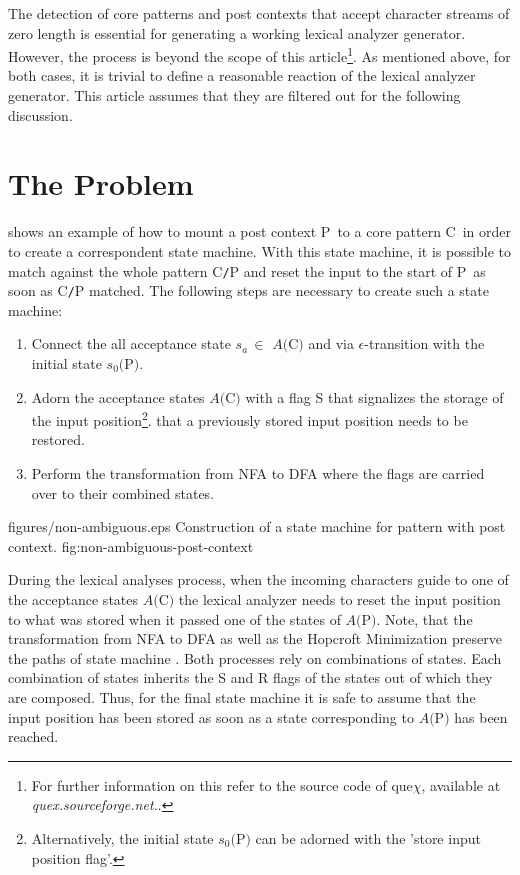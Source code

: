 \documentclass[acmtoplas]{acmtrans2m}
\newcommand{\quex}{que$\chi$}
\newcommand{\fa}[1]{$A(${\sf #1}$)$}
\newcommand{\fsz}[1]{$s_0(${\sf #1}$)$}
\newcommand{\pP}{{\sf P}}
\newcommand{\pC}{{\sf C}}
\begin{document}
The detection of core patterns and post contexts that accept character streams
of zero length is essential for generating a working lexical analyzer
generator.  However, the process is beyond the scope of this
article\footnote{For further information on this refer to the source code of
    \quex, available at {\it quex.sourceforge.net.}.}. As mentioned above, for
    both cases,  it is trivial to define a  reasonable reaction of the lexical analyzer
    generator. This article assumes that they are filtered out for the
    following discussion.

\section{The Problem}
\label{sec:the-problem}

 shows an example of how to mount a post context \pP\  
to a core pattern \pC\ in order to create a correspondent state machine. With this
state machine, it is possible to match against the whole pattern {\sf C{\tt /}P}
and reset the input to the start of \pP\ as soon as {\sf C{\tt /}P} matched.
The following steps are necessary to create such a state machine:

\begin{enumerate}
\item Connect the all acceptance state $s_a\,\in$ \fa{C} and via $\epsilon$-transition
      with the initial state \fsz{P}.
\item Adorn the acceptance states \fa{C} with a flag {\sf S} that signalizes 
      the storage of the input position\footnote{Alternatively, the initial state $s_0($\pP$)$ can
          be adorned with the 'store input position flag'.}.
      that a previously stored input position needs to be restored.
\item Perform the transformation from NFA to DFA where the flags are carried over to
      their combined states.
\end{enumerate}

\showpic
{figures/non-ambiguous.eps}
{Construction of a state machine for pattern with post context.}
{fig:non-ambiguous-post-context}

During the lexical analyses process, when the incoming characters guide to one
of the acceptance states \fa{C} the lexical analyzer needs to reset the
input position to what was stored when it passed one of the states of \fa{P}.
Note, that the transformation from NFA to DFA as well as the Hopcroft
Minimization preserve the paths of state machine \cite{Aho:2007}. Both processes rely on
combinations of states. Each combination of states inherits the {\sf S}
and {\sf R} flags of the states out of which they are composed. Thus, for the
final state machine it is safe to assume that the input position has been
stored as soon as a state corresponding to \fa{P} has been reached.
\end{document}
